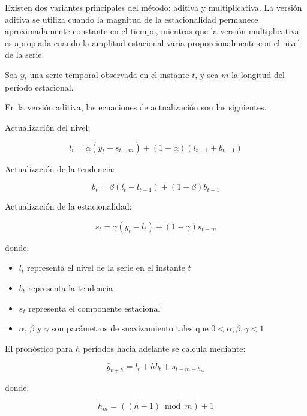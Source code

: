Existen dos variantes principales del método: aditiva y multiplicativa. La versión aditiva se utiliza cuando la magnitud de la estacionalidad permanece aproximadamente constante en el tiempo, mientras que la versión multiplicativa es apropiada cuando la amplitud estacional varía proporcionalmente con el nivel de la serie.


Sea \(y_t\) una serie temporal observada en el instante \(t\), y sea \(m\) la longitud del período estacional.

En la versión aditiva, las ecuaciones de actualización son las siguientes.

Actualización del nivel:

\begin{equation}
	l_t = \alpha (y_t - s_{t-m}) + (1-\alpha)(l_{t-1} + b_{t-1})
\end{equation}

Actualización de la tendencia:

\begin{equation}
	b_t = \beta (l_t - l_{t-1}) + (1-\beta)b_{t-1}
\end{equation}

Actualización de la estacionalidad:

\begin{equation}
	s_t = \gamma (y_t - l_t) + (1-\gamma)s_{t-m}
\end{equation}

donde:

\begin{itemize}
	\item \(l_t\) representa el nivel de la serie en el instante \(t\)
	\item \(b_t\) representa la tendencia
	\item \(s_t\) representa el componente estacional
	\item \(\alpha\), \(\beta\) y \(\gamma\) son parámetros de suavizamiento tales que \(0 < \alpha, \beta, \gamma < 1\)
\end{itemize}

El pronóstico para \(h\) períodos hacia adelante se calcula mediante:

\begin{equation}
	\hat{y}_{t+h} = l_t + hb_t + s_{t-m+h_m}
\end{equation}

donde:

\begin{equation}
	h_m = ((h-1) \bmod m) + 1
\end{equation}

